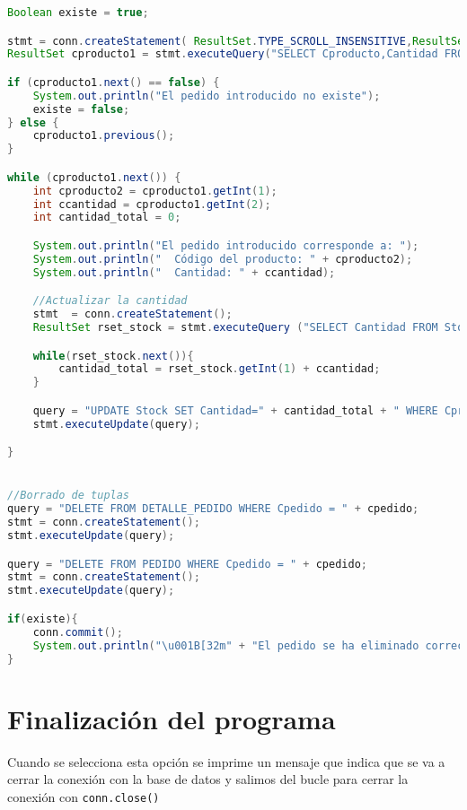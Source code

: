 \begin{lstlisting}[language=Java]
Boolean existe = true;

stmt = conn.createStatement( ResultSet.TYPE_SCROLL_INSENSITIVE,ResultSet.CONCUR_READ_ONLY);
ResultSet cproducto1 = stmt.executeQuery("SELECT Cproducto,Cantidad FROM Detalle_pedido WHERE Cpedido='"+ cpedido + "'");

if (cproducto1.next() == false) {
	System.out.println("El pedido introducido no existe");
	existe = false;
} else {
	cproducto1.previous();
}

while (cproducto1.next()) {
	int cproducto2 = cproducto1.getInt(1);
	int ccantidad = cproducto1.getInt(2);
	int cantidad_total = 0;

	System.out.println("El pedido introducido corresponde a: ");
	System.out.println("  Código del producto: " + cproducto2);
	System.out.println("  Cantidad: " + ccantidad);

	//Actualizar la cantidad
	stmt  = conn.createStatement();
	ResultSet rset_stock = stmt.executeQuery ("SELECT Cantidad FROM Stock WHERE Cproducto='" + cproducto2 + "'");

	while(rset_stock.next()){
		cantidad_total = rset_stock.getInt(1) + ccantidad;
	}

	query = "UPDATE Stock SET Cantidad=" + cantidad_total + " WHERE Cproducto='" + cproducto2+ "'";
	stmt.executeUpdate(query);

}


//Borrado de tuplas
query = "DELETE FROM DETALLE_PEDIDO WHERE Cpedido = " + cpedido;
stmt = conn.createStatement();
stmt.executeUpdate(query);

query = "DELETE FROM PEDIDO WHERE Cpedido = " + cpedido;
stmt = conn.createStatement();
stmt.executeUpdate(query);

if(existe){
	conn.commit();
	System.out.println("\u001B[32m" + "El pedido se ha eliminado correctamente" + "\u001B[0m");
}
\end{lstlisting}


\section{Finalización del programa}

Cuando se selecciona esta opción se imprime un mensaje que indica que se va a cerrar la conexión con la base de datos y salimos del bucle para cerrar la conexión con \texttt{conn.close()}